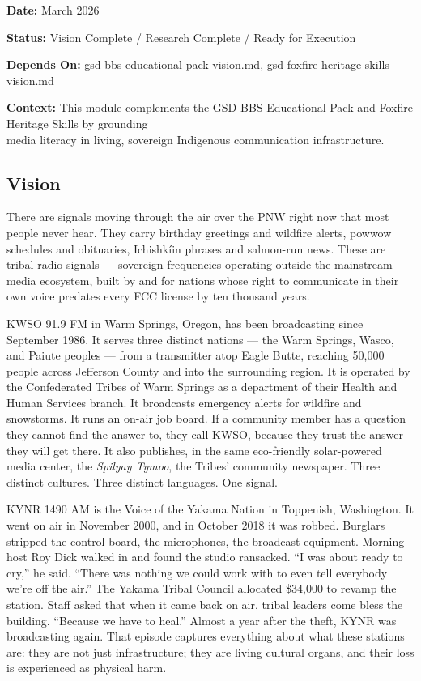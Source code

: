 \documentclass[11pt,letterpaper]{article}
\newcommand{\metafield}[2]{\textbf{\sffamily #1} #2\par}
\begin{document}
\metafield{Date:}{March 2026}
\metafield{Status:}{Vision Complete / Research Complete / Ready for Execution}
\metafield{Depends On:}{gsd-bbs-educational-pack-vision.md, gsd-foxfire-heritage-skills-vision.md}
\metafield{Context:}{This module complements the GSD BBS Educational Pack and Foxfire Heritage Skills by grounding\\ media literacy in living, sovereign Indigenous communication infrastructure.}

\subsection{Vision}

There are signals moving through the air over the PNW right now that most people never hear. They carry birthday greetings and wildfire alerts, powwow schedules and obituaries, Ichishkíin phrases and salmon-run news. These are tribal radio signals — sovereign frequencies operating outside the mainstream media ecosystem, built by and for nations whose right to communicate in their own voice predates every FCC license by ten thousand years.

KWSO 91.9 FM in Warm Springs, Oregon, has been broadcasting since September 1986. It serves three distinct nations — the Warm Springs, Wasco, and Paiute peoples — from a transmitter atop Eagle Butte, reaching 50,000 people across Jefferson County and into the surrounding region. It is operated by the Confederated Tribes of Warm Springs as a department of their Health and Human Services branch. It broadcasts emergency alerts for wildfire and snowstorms. It runs an on-air job board. If a community member has a question they cannot find the answer to, they call KWSO, because they trust the answer they will get there. It also publishes, in the same eco-friendly solar-powered media center, the \textit{Spilyay Tymoo}, the Tribes' community newspaper. Three distinct cultures. Three distinct languages. One signal.

KYNR 1490 AM is the Voice of the Yakama Nation in Toppenish, Washington. It went on air in November 2000, and in October 2018 it was robbed. Burglars stripped the control board, the microphones, the broadcast equipment. Morning host Roy Dick walked in and found the studio ransacked. ``I was about ready to cry,'' he said. ``There was nothing we could work with to even tell everybody we're off the air.'' The Yakama Tribal Council allocated \$34,000 to revamp the station. Staff asked that when it came back on air, tribal leaders come bless the building. ``Because we have to heal.'' Almost a year after the theft, KYNR was broadcasting again. That episode captures everything about what these stations are: they are not just infrastructure; they are living cultural organs, and their loss is experienced as physical harm.
\end{document}

